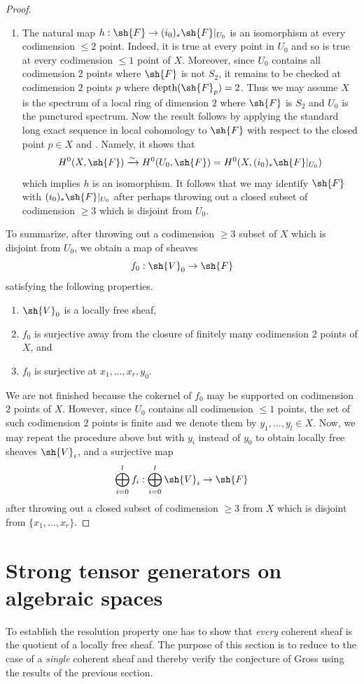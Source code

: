 \documentclass[12pt]{amsart}
\begin{document}
\begin{proof}
\begin{enumerate}
\item The natural map $h: \sh{F} \to (i_0)_*\sh{F}|_{U_0}$ is an isomorphism at every codimension $\leq 2$ point. Indeed, it is true at every point in $U_0$ and so is true at every codimension $\leq 1$ point of $X$. Moreover, since $U_0$ contains all codimension $2$ points where $\sh{F}$ is not $S_2$, it remains to be checked at codimension $2$ points $p$ where $\text{depth}(\sh{F}_p)=2$. Thus we may assume $X$ is the spectrum of a local ring of dimension $2$ where $\sh{F}$ is $S_2$ and $U_0$ is the punctured spectrum. Now the result follows by applying the standard long exact sequence in local cohomology to $\sh{F}$ with respect to the closed point $p \in X$ and \cite[Thm. 3.8]{MR0224620}. Namely, it shows that 
\[H^0(X,\sh{F}) \xrightarrow{\sim} H^0(U_0,\sh{F})=H^0(X,(i_0)_*\sh{F}|_{U_0})\]
which implies $h$ is an isomorphism. It follows that we may identify $\sh{F}$ with $(i_0)_*\sh{F}|_{U_0}$ after perhaps throwing out a closed subset of codimension $\geq 3$ which is disjoint from $U_0$.

\end{enumerate}
To summarize, after throwing out a codimension $\geq 3$ subset of $X$ which is disjoint from $U_0$, we obtain a map of sheaves 
\[f_0: \sh{V}_0 \to \sh{F}\] 
satisfying the following properties.
\begin{enumerate} 
\item $\sh{V}_0$ is a locally free sheaf, 
\item $f_0$ is surjective away from the closure of finitely many codimension $2$ points of $X$, and
\item $f_0$ is surjective at $x_1,...,x_r,y_0$.
\end{enumerate}

We are not finished because the cokernel of $f_0$ may be supported on codimension $2$ points of $X$. However, since $U_0$ contains all codimension $\leq 1$ points, the set of such codimension $2$ points is finite and we denote them by $y_1,...,y_l \in X$. Now, we may repeat the procedure above but with $y_i$ instead of $y_0$ to obtain locally free sheaves $\sh{V}_{i}$, and a surjective map
\[\bigoplus_{i=0}^l f_{i}:\bigoplus_{i=0}^l \sh{V}_{i} \to \sh{F}\]
after throwing out a closed subset of codimension $\geq 3$ from $X$ which is disjoint from $\{x_1,...,x_r\}$. \end{proof}




\section{Strong tensor generators on algebraic spaces} \label{strong}
To establish the resolution property one has to show that \emph{every} coherent sheaf is the quotient of a locally free sheaf. The purpose of this section is to reduce to the case of a \emph{single} coherent sheaf and thereby verify the conjecture of Gross using the results of the previous section.
\end{document}
